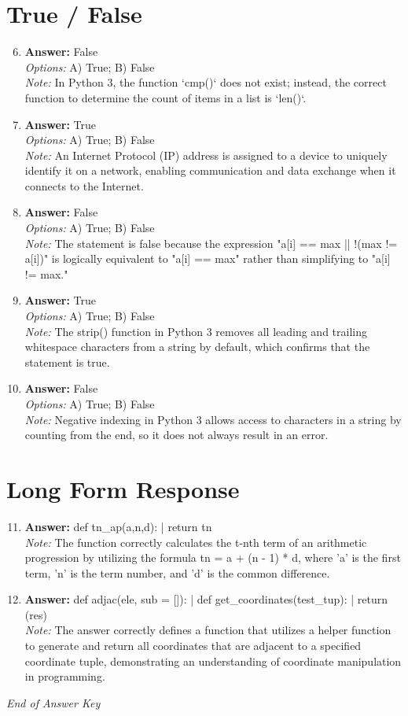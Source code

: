 \documentclass[12pt]{article}
\begin{document}
\section*{True / False}
\begin{enumerate}[label=\arabic*.]
\setcounter{enumi}{5}
\item \textbf{Answer:} False
\\ \textit{Options:} A) True; B) False
\\ \textit{Note:} In Python 3, the function `cmp()` does not exist; instead, the correct function to determine the count of items in a list is `len()`.
\item \textbf{Answer:} True
\\ \textit{Options:} A) True; B) False
\\ \textit{Note:} An Internet Protocol (IP) address is assigned to a device to uniquely identify it on a network, enabling communication and data exchange when it connects to the Internet.
\item \textbf{Answer:} False
\\ \textit{Options:} A) True; B) False
\\ \textit{Note:} The statement is false because the expression "a[i] == max || !(max != a[i])" is logically equivalent to "a[i] == max" rather than simplifying to "a[i] != max."
\item \textbf{Answer:} True
\\ \textit{Options:} A) True; B) False
\\ \textit{Note:} The strip() function in Python 3 removes all leading and trailing whitespace characters from a string by default, which confirms that the statement is true.
\item \textbf{Answer:} False
\\ \textit{Options:} A) True; B) False
\\ \textit{Note:} Negative indexing in Python 3 allows access to characters in a string by counting from the end, so it does not always result in an error.
\end{enumerate}

\section*{Long Form Response}
\begin{enumerate}[label=\arabic*.]
\setcounter{enumi}{10}
\item \textbf{Answer:} def tn\_ap(a,n,d): | return tn
\\ \textit{Note:} The function correctly calculates the t-nth term of an arithmetic progression by utilizing the formula tn = a + (n - 1) * d, where 'a' is the first term, 'n' is the term number, and 'd' is the common difference.
\item \textbf{Answer:} def adjac(ele, sub = []): | def get\_coordinates(test\_tup): | return (res)
\\ \textit{Note:} The answer correctly defines a function that utilizes a helper function to generate and return all coordinates that are adjacent to a specified coordinate tuple, demonstrating an understanding of coordinate manipulation in programming.
\end{enumerate}

\vfill
\noindent\textit{End of Answer Key}
\end{document}
